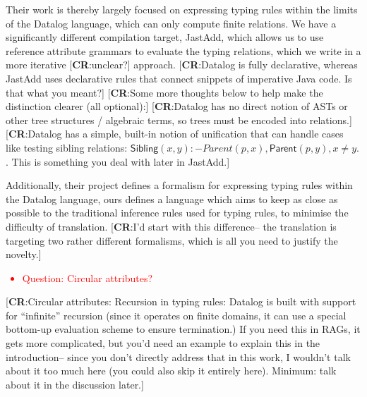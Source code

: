 \documentclass[nofilelist]{cslthse-msc}
\newcommand{\CR}[1]{\textcolor{green!60!black}{[\textbf{CR}:#1]}}
\newcommand{\reviewquestion}[1]{\textcolor{red}{\begin{itemize}\item Question: #1\end{itemize}}}
\begin{document}
Their work is thereby largely focused on expressing typing rules within the limits of the Datalog language, which can only compute finite relations.
We have a significantly different compilation target, JastAdd, which allows us to use reference attribute grammars to evaluate the typing relations, which we write in a more iterative \CR{unclear?} approach.
\CR{Datalog is fully declarative, whereas JastAdd uses declarative rules that connect snippets of imperative Java code.  Is that what you meant?}
\CR{Some more thoughts below to help make the distinction clearer (all optional):}
\CR{Datalog has no direct notion of ASTs or other tree structures / algebraic terms, so trees must be encoded into relations.}
\CR{Datalog has a simple, built-in notion of unification that can handle cases like testing sibling relations: $\textsf{Sibling}(x, y) :- Parent(p, x), \textsf{Parent}(p, y), x \ne y.$.
    This is something you deal with later in JastAdd.}

Additionally, their project defines a formalism for expressing typing rules within the Datalog language, ours defines a language which aims to keep as close as possible to the traditional inference rules used for typing rules, to minimise the difficulty of translation.
\CR{I'd start with this difference-- the translation is targeting two rather different formalisms, which is all you need to justify the novelty.}

\reviewquestion{Circular attributes?}
\CR{Circular attributes: Recursion in typing rules: Datalog is built with support for ``infinite'' recursion (since it operates on finite domains,
  it can use a special bottom-up evaluation scheme to ensure termination.)
  If you need this in RAGs, it gets more complicated, but you'd need an example to explain this in the introduction-- since you don't directly address that in this work,
  I wouldn't talk about it too much here (you could also skip it entirely here).  Minimum: talk about it in the discussion later.}
\end{document}
